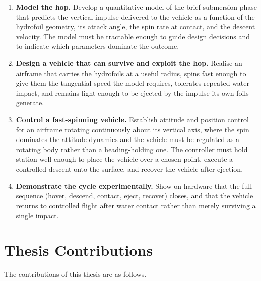 \begin{enumerate}
  \item \textbf{Model the hop.}  Develop a quantitative model of the brief
    submersion phase that predicts the vertical impulse delivered to the
    vehicle as a function of the hydrofoil geometry, its attack angle, the spin
    rate at contact, and the descent velocity.  The model must be tractable
    enough to guide design decisions and to indicate which parameters dominate
    the outcome.

  \item \textbf{Design a vehicle that can survive and exploit the hop.}
    Realise an airframe that carries the hydrofoils at a useful radius, spins
    fast enough to give them the tangential speed the model requires, tolerates
    repeated water impact, and remains light enough to be ejected by the
    impulse its own foils generate.

  \item \textbf{Control a fast-spinning vehicle.}  Establish attitude and
    position control for an airframe rotating continuously about its vertical
    axis, where the spin dominates the attitude dynamics and the vehicle must
    be regulated as a rotating body rather than a heading-holding one.  The
    controller must hold station well enough to place the vehicle over a chosen
    point, execute a controlled descent onto the surface, and recover the
    vehicle after ejection.

  \item \textbf{Demonstrate the cycle experimentally.}  Show on hardware that
    the full sequence (hover, descend, contact, eject, recover) closes, and
    that the vehicle returns to controlled flight after water contact rather
    than merely surviving a single impact.
\end{enumerate}

\section{Thesis Contributions}
\label{sec:thesis_contributions}

The contributions of this thesis are as follows.

